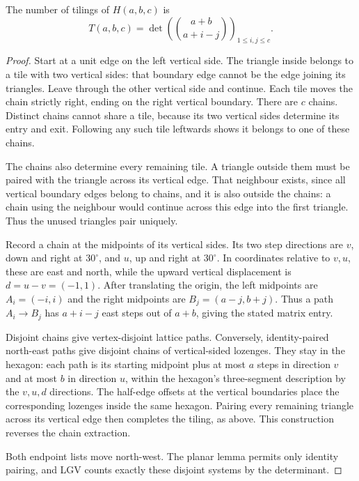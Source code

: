 \begin{theorem}\label{linear:thm:lozenge}
The number of tilings of $H(a,b,c)$ is
\[T(a,b,c)=\det\left(\binom{a+b}{a+i-j}\right)_{1\le i,j\le c}.\]
\end{theorem}
\begin{proof}
Start at a unit edge on the left vertical side. The triangle inside belongs to a tile with two vertical sides: that boundary edge cannot be the edge joining its triangles. Leave through the other vertical side and continue. Each tile moves the chain strictly right, ending on the right vertical boundary. There are $c$ chains. Distinct chains cannot share a tile, because its two vertical sides determine its entry and exit. Following any such tile leftwards shows it belongs to one of these chains.

The chains also determine every remaining tile. A triangle outside them must be paired with the triangle across its vertical edge. That neighbour exists, since all vertical boundary edges belong to chains, and it is also outside the chains: a chain using the neighbour would continue across this edge into the first triangle. Thus the unused triangles pair uniquely.

Record a chain at the midpoints of its vertical sides. Its two step directions are $v$, down and right at $30^\circ$, and $u$, up and right at $30^\circ$. In coordinates relative to $v,u$, these are east and north, while the upward vertical displacement is $d=u-v=(-1,1)$. After translating the origin, the left midpoints are $A_i=(-i,i)$ and the right midpoints are $B_j=(a-j,b+j)$. Thus a path $A_i\to B_j$ has $a+i-j$ east steps out of $a+b$, giving the stated matrix entry.

Disjoint chains give vertex-disjoint lattice paths. Conversely, identity-paired north-east paths give disjoint chains of vertical-sided lozenges. They stay in the hexagon: each path is its starting midpoint plus at most $a$ steps in direction $v$ and at most $b$ in direction $u$, within the hexagon's three-segment description by the $v,u,d$ directions. The half-edge offsets at the vertical boundaries place the corresponding lozenges inside the same hexagon. Pairing every remaining triangle across its vertical edge then completes the tiling, as above. This construction reverses the chain extraction.

Both endpoint lists move north-west. The planar lemma permits only identity pairing, and LGV counts exactly these disjoint systems by the determinant.
\end{proof}

